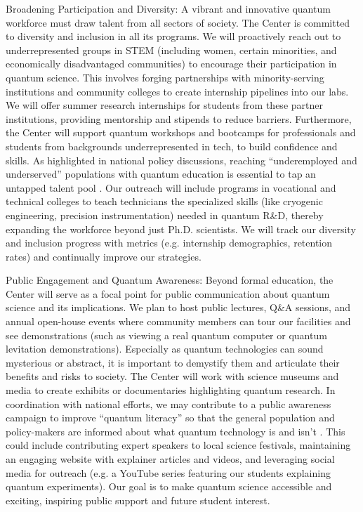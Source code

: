 \documentclass[12pt]{article}
\begin{document}
Broadening Participation and Diversity: A vibrant and innovative quantum workforce must draw talent from all sectors of society. The Center is committed to diversity and inclusion in all its programs. We will proactively reach out to underrepresented groups in STEM (including women, certain minorities, and economically disadvantaged communities) to encourage their participation in quantum science. This involves forging partnerships with minority-serving institutions and community colleges to create internship pipelines into our labs. We will offer summer research internships for students from these partner institutions, providing mentorship and stipends to reduce barriers. Furthermore, the Center will support quantum workshops and bootcamps for professionals and students from backgrounds underrepresented in tech, to build confidence and skills. As highlighted in national policy discussions, reaching “underemployed and underserved” populations with quantum education is essential to tap an untapped talent pool . Our outreach will include programs in vocational and technical colleges to teach technicians the specialized skills (like cryogenic engineering, precision instrumentation) needed in quantum R&D, thereby expanding the workforce beyond just Ph.D. scientists. We will track our diversity and inclusion progress with metrics (e.g. internship demographics, retention rates) and continually improve our strategies.



Public Engagement and Quantum Awareness: Beyond formal education, the Center will serve as a focal point for public communication about quantum science and its implications. We plan to host public lectures, Q&A sessions, and annual open-house events where community members can tour our facilities and see demonstrations (such as viewing a real quantum computer or quantum levitation demonstrations). Especially as quantum technologies can sound mysterious or abstract, it is important to demystify them and articulate their benefits and risks to society. The Center will work with science museums and media to create exhibits or documentaries highlighting quantum research. In coordination with national efforts, we may contribute to a public awareness campaign to improve “quantum literacy” so that the general population and policy-makers are informed about what quantum technology is and isn’t . This could include contributing expert speakers to local science festivals, maintaining an engaging website with explainer articles and videos, and leveraging social media for outreach (e.g. a YouTube series featuring our students explaining quantum experiments). Our goal is to make quantum science accessible and exciting, inspiring public support and future student interest.
\end{document}
